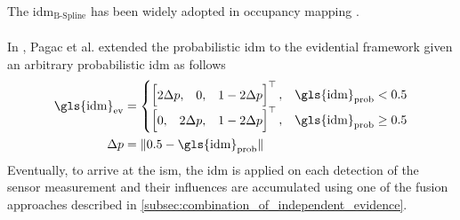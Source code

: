 The \gls{idm}$_{\text{B-Spline}}$ has been widely adopted in occupancy mapping \cite{mouhagir2017using,reineking2013evidential,yu2015evidential}.
\\\\
In \cite{pagac1996evidential}, Pagac et al. extended the probabilistic \gls{idm} to the evidential framework given an arbitrary probabilistic \gls{idm} as follows  
\begin{align}
	\label{eq:ev_ray_casting_model}
	\text{\gls{idm}}_{\text{ev}} &=
	\begin{cases}
		\begin{bmatrix} 2\Delta p, &0, &1 - 2\Delta p \end{bmatrix}^{\top}, & \text{\gls{idm}}_{\text{prob}} < 0.5 \\
		\begin{bmatrix} 0, &2\Delta p, &1 - 2\Delta p \end{bmatrix}^{\top}, & \text{\gls{idm}}_{\text{prob}} \geq 0.5
	\end{cases}\\
	\Delta p &= \| 0.5 - \text{\gls{idm}}_{\text{prob}} \|
\end{align}
Eventually, to arrive at the \gls{ism}, the \gls{idm} is applied on each detection of the sensor measurement and their influences are accumulated using one of the fusion approaches described in \ref{subsec:combination_of_independent_evidence}.
%
